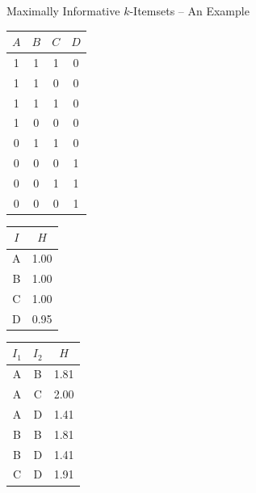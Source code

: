 \documentclass[12pt]{beamer}
\theoremstyle{break}
\begin{document}
\begin{frame}{Maximally Informative $k$-Itemsets -- An Example}

	\begin{table}
	\centering
    \begin{minipage}{.3\textwidth}
        \centering
        \begin{tabular}{c c c c}
            \toprule
            $A$ & $B$ & $C$ & $D$ \\
            \midrule
            1 & 1 & 1 & 0 \\
            1 & 1 & 0 & 0 \\
            1 & 1 & 1 & 0 \\ 
            1 & 0 & 0 & 0 \\
            0 & 1 & 1 & 0 \\
            0 & 0 & 0 & 1 \\
            0 & 0 & 1 & 1 \\
            0 & 0 & 0 & 1 \\
            \bottomrule
        \end{tabular}
    \end{minipage}%
    \begin{minipage}{.3\textwidth}
        \centering
        \begin{tabular}{c c}
            \toprule
            $I$ & $H$ \\
            \midrule
            A & 1.00 \\
            B & 1.00 \\
            C & 1.00 \\
            D & 0.95 \\
            \bottomrule
        \end{tabular}
    \end{minipage}%
    \begin{minipage}{.3\textwidth}
        \centering
        \begin{tabular}{c c c}
            \toprule
            $I_{1}$ & $I_{2}$ & $H$ \\
            \midrule
            A & B & 1.81 \\
            A & C & 2.00 \\
            A & D & 1.41 \\
            B & B & 1.81 \\
            B & D & 1.41 \\
            C & D & 1.91 \\
            \bottomrule
        \end{tabular}
    \end{minipage}
\end{table}
	
\end{frame}
\end{document}
